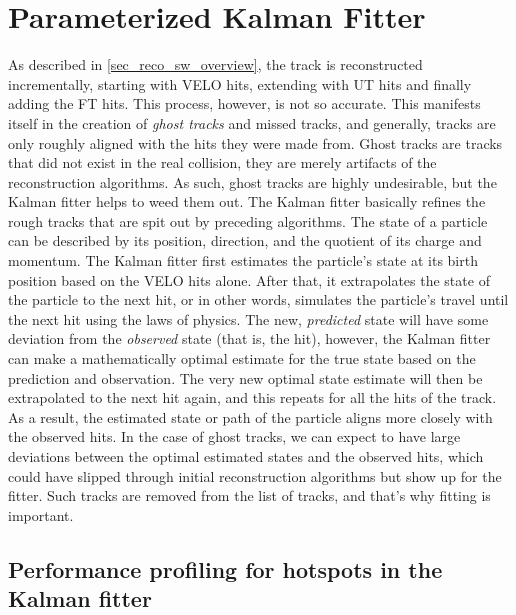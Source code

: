 \documentclass[12pt]{article}
\begin{document}
\section{Parameterized Kalman Fitter}\label{sec_kalman_main}

As described in \ref{sec_reco_sw_overview}, the track is reconstructed incrementally, starting with VELO hits, extending with UT hits and finally adding the FT hits. This process, however, is not so accurate. This manifests itself in the creation of \textit{ghost tracks} and missed tracks, and generally, tracks are only roughly aligned with the hits they were made from. Ghost tracks are tracks that did not exist in the real collision, they are merely artifacts of the reconstruction algorithms. As such, ghost tracks are highly undesirable, but the Kalman fitter helps to weed them out. 
The Kalman fitter basically refines the rough tracks that are spit out by preceding algorithms. The state of a particle can be described by its position, direction, and the quotient of its charge and momentum. The Kalman fitter first estimates the particle's state at its birth position based on the VELO hits alone. After that, it extrapolates the state of the particle to the next hit, or in other words, simulates the particle's travel until the next hit using the laws of physics. The new, \textit{predicted} state will have some deviation from the \textit{observed} state (that is, the hit), however, the Kalman fitter can make a mathematically optimal estimate for the true state based on the prediction and observation. The very new optimal state estimate will then be extrapolated to the next hit again, and this repeats for all the hits of the track.
As a result, the estimated state or path of the particle aligns more closely with the observed hits. In the case of ghost tracks, we can expect to have large deviations between the optimal estimated states and the observed hits, which could have slipped through initial reconstruction algorithms but show up for the fitter. Such tracks are removed from the list of tracks, and that's why fitting is important.


\subsection{Performance profiling for hotspots in the Kalman fitter}
\end{document}
